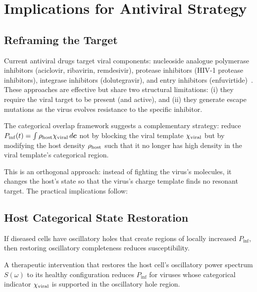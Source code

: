 \section{Implications for Antiviral Strategy}
\label{v:sec:antiviral}

\subsection{Reframing the Target}

Current antiviral drugs target viral components: nucleoside analogue polymerase inhibitors (aciclovir, ribavirin, remdesivir), protease inhibitors (HIV-1 protease inhibitors), integrase inhibitors (dolutegravir), and entry inhibitors (enfuvirtide)~\cite{Kaufmann2011}. These approaches are effective but share two structural limitations: (i) they require the viral target to be present (and active), and (ii) they generate escape mutations as the virus evolves resistance to the specific inhibitor.

The categorical overlap framework suggests a complementary strategy: reduce $P_{\mathrm{inf}}(t) = \int \rho_{\mathrm{host}} \chi_{\mathrm{viral}}\,d\boldsymbol{c}$ not by blocking the viral template $\chi_{\mathrm{viral}}$ but by modifying the host density $\rho_{\mathrm{host}}$ such that it no longer has high density in the viral template's categorical region.

This is an orthogonal approach: instead of fighting the virus's molecules, it changes the host's state so that the virus's charge template finds no resonant target. The practical implications follow:

\subsection{Host Categorical State Restoration}

If diseased cells have oscillatory holes that create regions of locally increased $P_{\mathrm{inf}}$, then restoring oscillatory completeness reduces susceptibility.

\begin{proposition}
A therapeutic intervention that restores the host cell's oscillatory power spectrum $S(\omega)$ to its healthy configuration reduces $P_{\mathrm{inf}}$ for viruses whose categorical indicator $\chi_{\mathrm{viral}}$ is supported in the oscillatory hole region.
\end{proposition}

